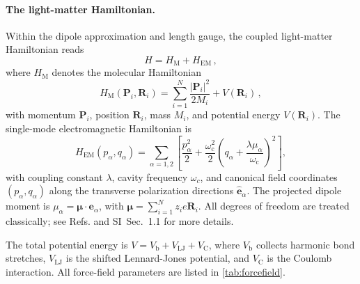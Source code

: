\documentclass[aps, prl,
 reprint,
 superscriptaddress,
 citeautoscript,
 amsmath,amssymb,
 tightenlines
]{revtex4-2}
\begin{document}
\paragraph*{The light-matter Hamiltonian.} Within the dipole approximation and length gauge, the coupled light-matter Hamiltonian reads
\begin{equation}
H = H_\mathrm{M}+H_\mathrm{EM} \,,
\label{eq:tot_hamiltonian}
\end{equation}
where $H_\mathrm{M}$ denotes the molecular Hamiltonian
\begin{equation}
H_\mathrm{M}({ \bm P_i,\bm R_i }) = \sum_{i=1}^{N} \frac{|\bm P_i|^2}{2 M_i} +V({ \bm R_i}) \,,
\end{equation}
with momentum $\bm{P}_i$, position $\bm{R}_i$, mass $M_i$, and potential energy $V({ \bm R_i })$. The single-mode electromagnetic Hamiltonian is\cite{li2020cavity,li2021cavity}
\begin{equation}
H_\mathrm{EM} ({ p_\alpha, q_\alpha }) = \sum_{\alpha=1,2} \left[ \frac{p_\alpha^2}{2}+\frac{\omega_\mathrm{c}^2}{2} \left(q_\alpha +\frac{ \lambda \mu_\alpha}{\omega_\mathrm{c}} \right)^2 \right], \label{eq:Hem}
\end{equation}
with coupling constant $\lambda$, cavity frequency $\omega_c$, and canonical field coordinates $(p_\alpha, q_\alpha)$ along the transverse polarization directions ${\bm{\hat{e}}_\alpha}$. The projected dipole moment is $\mu_\alpha = \bm \mu \cdot \bm e_\alpha$, with $\bm{\mu} = \sum_{i=1}^N z_i e \bm{R}_i$. All degrees of freedom are treated classically; see Refs.\cite{li2020cavity,li2021cavity} and SI~Sec.~1.1 for more details.
 
The total potential energy is $V = V_\mathrm{b}+V_\mathrm{LJ}+V_\mathrm{C}$, where $V_\mathrm{b}$ collects harmonic bond stretches, $V_\mathrm{LJ}$ is the shifted Lennard-Jones potential, and $V_\mathrm{C}$ is the Coulomb interaction. All force-field parameters are listed in \cref{tab:forcefield}.
\end{document}
